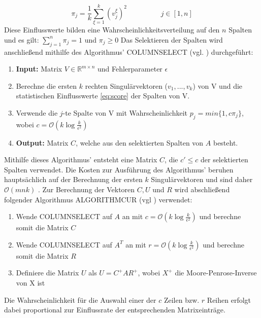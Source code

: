 \documentclass[12pt,a4paper,twoside]{article}
\begin{document}
		\begin{equation}
			\label{eq:score}
			\pi_j=\frac{1}{k}\sum_{\xi=1}^k(v_j^\xi)^2 \hspace{2cm} j\in [1,n]
		\end{equation}
		Diese Einflusswerte bilden eine Wahrscheinlichkeitsverteilung auf den $n$ Spalten und es gilt: $\sum_{j=1}^n\pi_j=1$ und $\pi_j\geq 0$ \newline
		Das Selektieren der Spalten wird anschließend mithilfe des Algorithmus' COLUMNSELECT (vgl. \citep{mahoney2008}) durchgeführt: \newline
		\begin{enumerate}
			\item \textbf{Input:} Matrix $V\in \mathds{R}^{m\times n}$ und Fehlerparameter $\epsilon$
			\item Berechne die ersten $k$ rechten Singulärvektoren ($v_1,...,v_k$) von V und die statistischen Einflusswerte \ref{eq:score} der Spalten von V.
			\item Verwende die $j$-te Spalte von V mit Wahrscheinlichkeit $p_j=min\{1,c\pi_j\}$, wobei $c=\mathcal{O}(k \log \frac{k}{\epsilon^2})$
			\item \textbf{Output:} Matrix $C$, welche aus den selektierten Spalten von $A$ besteht.
		\end{enumerate}
		Mithilfe dieses Algorithmus' entsteht eine Matrix $C$, die $c'\leq c$ der selektierten Spalten verwendet. Die 
		Kosten zur Ausführung des Algorithmus' beruhen hauptsächlich auf der Berechnung der ersten $k$ 
		Singulärvektoren und sind daher $\mathcal{O}(mnk)$ \citep{mahoney2008}.\newline
		Zur Berechnung der Vektoren $C,U$ und $R$ wird abschließend folgender Algorithmus ALGORITHMCUR (vgl \citep{mahoney2008}) verwendet:
		\begin{enumerate}
			\item Wende COLUMNSELECT auf $A$ an mit $c=\mathcal{O}(k \log \frac{k}{\epsilon^2})$ und berechne somit die Matrix $C$
			\item Wende COLUMNSELECT auf $A^T$ an mit $r=\mathcal{O}(k \log \frac{k}{\epsilon^2})$ und berechne somit die Matrix $R$
			\item Definiere die Matrix $U$ als $U=C^+AR^+$, wobei $X^+$ die Moore-Penrose-Inverse von X ist
		\end{enumerate}
		Die Wahrscheinlichkeit für die Auswahl einer der $c$ Zeilen bzw. $r$ Reihen erfolgt dabei proportional zur Einflussrate der entsprechenden Matrixeinträge. \newline
\end{document}
